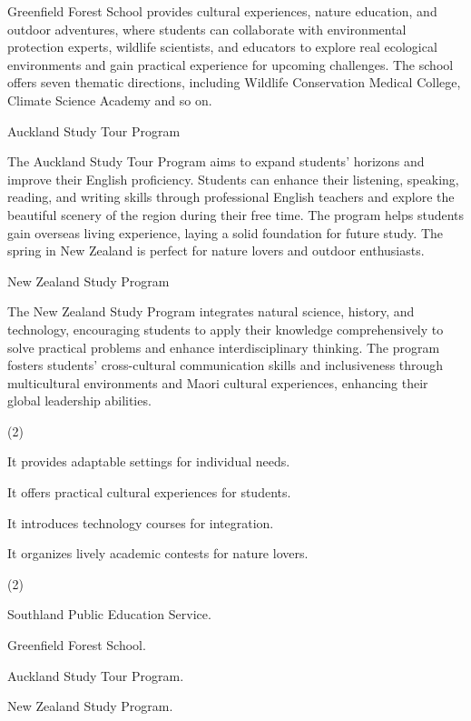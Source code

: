 \documentclass{英语试卷}
\begin{document}
\par Greenfield Forest School provides cultural experiences, nature education, and outdoor adventures, where students can collaborate with environmental protection experts, wildlife scientists, and educators to explore real ecological environments and gain practical experience for upcoming challenges. The school offers seven thematic directions, including Wildlife Conservation Medical College, Climate Science Academy and so on.\par
\par Auckland Study Tour Program\par
\par The Auckland Study Tour Program aims to expand students' horizons and improve their English proficiency. Students can enhance their listening, speaking, reading, and writing skills through professional English teachers and explore the beautiful scenery of the region during their free time. The program helps students gain overseas living experience, laying a solid foundation for future study. The spring in New Zealand is perfect for nature lovers and outdoor enthusiasts.\par
\par New Zealand Study Program\par
\par The New Zealand Study Program integrates natural science, history, and technology, encouraging students to apply their knowledge comprehensively to solve practical problems and enhance interdisciplinary thinking. The program fosters students' cross-cultural communication skills and inclusiveness through multicultural environments and Maori cultural experiences, enhancing their global leadership abilities.\par
{}
\begin{choices}(2)
  \item It provides adaptable settings for individual needs.
  \item It offers practical cultural experiences for students.
  \item It introduces technology courses for integration.
  \item It organizes lively academic contests for nature lovers.
\end{choices}
\begin{choices}(2)
  \item Southland Public Education Service.
  \item Greenfield Forest School.
  \item Auckland Study Tour Program.
  \item New Zealand Study Program.
\end{choices}
\end{document}
